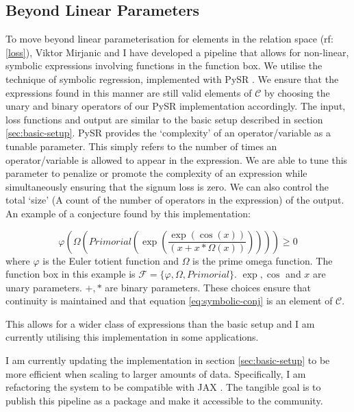 \subsection{Beyond Linear Parameters}
\label{sec:symbolic-implement}
To move beyond linear parameterisation for elements in the relation space (rf:\ref{loss}), Viktor Mirjanic and I have developed a pipeline that allows for non-linear, symbolic expressions involving functions in the function box. We utilise the technique of symbolic regression, implemented with PySR \cite{cranmerInterpretableMachineLearning2023}. We ensure that the expressions found in this manner are still valid elements of $\mathcal{C}$ by choosing the unary and binary operators of our PySR implementation accordingly.
The input, loss functions and output are similar to the basic setup described in section \ref{sec:basic-setup}. PySR provides the `complexity' of an operator/variable as a tunable parameter. This simply refers to the number of times an operator/variable is allowed to appear in the expression. We are able to tune this parameter to penalize or promote the complexity of an expression while simultaneously ensuring that the signum loss is zero. We can also control the total `size' (A count of the number of operators in the expression) of the output.
An example of a conjecture found by this implementation:
\begin{exmp}
    \label{exmp:symbolic-conj}
    \begin{equation*}
        \label{eq:symbolic-conj}
        \varphi\left(\Omega\left(Primorial\left(\exp\left(\frac{\exp(\cos(x))}{(x + x*\Omega(x))}\right)\right)\right)\right)\geq 0    
    \end{equation*}     
    where $\varphi$ is the Euler totient function and $\Omega$ is the prime omega function. The function box in this example is $\mathcal{F} = \{\varphi, \Omega, Primorial\}$. 
    $\exp,\cos$ and $x$ are unary parameters. $+,*$ are binary parameters. These choices ensure that continuity is maintained and that equation \ref{eq:symbolic-conj} is an element of $\mathcal{C}$.
\end{exmp} 

This allows for a wider class of expressions than the basic setup and I am currently utilising this implementation in some applications.

I am currently updating the implementation in section \ref{sec:basic-setup} to be more efficient when scaling to larger amounts of data. Specifically, I am refactoring the system to be compatible with JAX \cite{jax2018github}. The tangible goal is to publish this pipeline as a package and make it accessible to the community.

